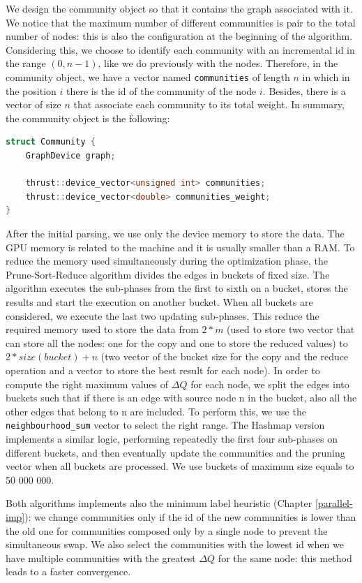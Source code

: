 We design the community object so that it contains the graph associated with it. We notice that the maximum number of different communities is pair to the total number of nodes: this is also the configuration at the beginning of the algorithm. Considering this, we choose to identify each community with an incremental id in the range $(0, n-1)$, like we do previously with the nodes. Therefore, in the community object, we have a vector named \verb|communities| of length $n$ in which in the position $i$ there is the id of the community of the node $i$. Besides, there is a vector of size $n$ that associate each community to its total weight.  In summary,  the community object is the following:
\begin{lstlisting}[language=C++]
struct Community {
	GraphDevice graph;
	
	thrust::device_vector<unsigned int> communities;
	thrust::device_vector<double> communities_weight;
}
\end{lstlisting}
After the initial parsing, we use only the device memory to store the data. The GPU memory is related to the machine and it is usually smaller than a RAM.
To reduce the memory used simultaneously during the optimization phase, the Prune-Sort-Reduce algorithm divides the edges in buckets of fixed size. 
The algorithm executes the sub-phases from the first to sixth on a bucket, stores the results and start the execution on another bucket. When all buckets are considered, we execute the last two updating sub-phases. This reduce the required memory used to store the data from $2*m$ (used to store two vector that can store all the nodes: one for the copy and one to store the reduced values) to $2*size(bucket) + n$ (two vector of the bucket size for the copy and the reduce operation and a vector to store the best result for each node). 
In order to compute the right maximum values of $\Delta Q$ for each node, we split the edges into buckets such that if there is an edge with source node n in the bucket, also all the other edges that belong to n are included. To perform this, we use the \verb|neighbourhood_sum| vector to select the right range. The Hashmap version implements a similar logic, performing repeatedly the first four sub-phases on different buckets,  and then eventually update the communities and the pruning vector when all buckets are processed. We use buckets of maximum size equals to 50 000 000.

Both algorithms implements also the minimum label heuristic (Chapter \ref{parallel-imp}): we change communities only if the id of the new communities is lower than the old one for communities composed only by a single node to prevent the simultaneous swap. We also select the communities with the lowest id when we have multiple communities with the greatest $\Delta Q$ for the same node: this method leads to a faster convergence.

